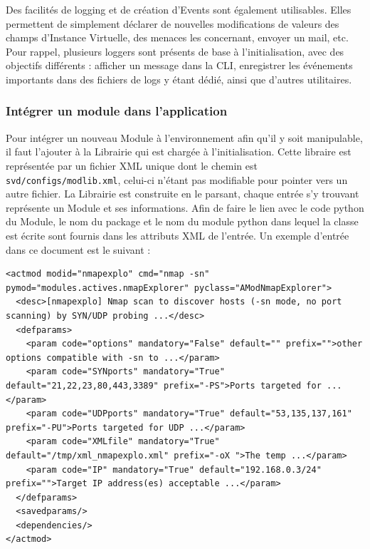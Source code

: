 \documentclass[]{article}
\begin{document}
\par Des facilités de logging et de création d'Events sont également utilisables. Elles permettent de simplement déclarer de nouvelles modifications de valeurs des champs d'Instance Virtuelle, des menaces les concernant, envoyer un mail, etc. Pour rappel, plusieurs loggers sont présents de base à l'initialisation, avec des objectifs différents : afficher un message dans la CLI, enregistrer les événements importants dans des fichiers de logs y étant dédié, ainsi que d'autres utilitaires.

\newpage

\subsubsection{Intégrer un module dans l'application}

Pour intégrer un nouveau Module à l'environnement afin qu'il y soit manipulable, il faut l'ajouter à la Librairie qui est chargée à l'initialisation. Cette libraire est représentée par un fichier XML unique dont le chemin est \texttt{svd/configs/modlib.xml}, celui-ci n'étant pas modifiable pour pointer vers un autre fichier. La Librairie est construite en le parsant, chaque entrée s'y trouvant représente un Module et ses informations. Afin de faire le lien avec le code python du Module, le nom du package et le nom du module python dans lequel la classe est écrite sont fournis dans les attributs XML de l'entrée. Un exemple d'entrée dans ce document est le suivant :
\small{
\lstset{language=XML}
\begin{lstlisting}
<actmod modid="nmapexplo" cmd="nmap -sn" pymod="modules.actives.nmapExplorer" pyclass="AModNmapExplorer">
  <desc>[nmapexplo] Nmap scan to discover hosts (-sn mode, no port scanning) by SYN/UDP probing ...</desc>
  <defparams>
    <param code="options" mandatory="False" default="" prefix="">other options compatible with -sn to ...</param>
    <param code="SYNports" mandatory="True" default="21,22,23,80,443,3389" prefix="-PS">Ports targeted for ...</param>
    <param code="UDPports" mandatory="True" default="53,135,137,161" prefix="-PU">Ports targeted for UDP ...</param>
    <param code="XMLfile" mandatory="True" default="/tmp/xml_nmapexplo.xml" prefix="-oX ">The temp ...</param>
    <param code="IP" mandatory="True" default="192.168.0.3/24" prefix="">Target IP address(es) acceptable ...</param>
  </defparams>
  <savedparams/>
  <dependencies/>
</actmod>
\end{lstlisting}
}
\end{document}
